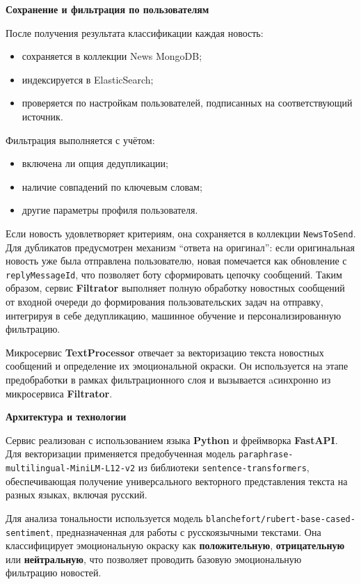 \textbf{Сохранение и фильтрация по пользователям}

После получения результата классификации каждая новость:
\begin{itemize}
    \item сохраняется в коллекции News MongoDB;
    \item индексируется в ElasticSearch;
    \item проверяется по настройкам пользователей, подписанных на соответствующий источник.
\end{itemize}
Фильтрация выполняется с учётом:
\begin{itemize}
    \item включена ли опция дедупликации;
    \item наличие совпадений по ключевым словам;
    \item другие параметры профиля пользователя.
\end{itemize}

Если новость удовлетворяет критериям, она сохраняется в коллекции \texttt{NewsToSend}.
Для дубликатов предусмотрен механизм ``ответа на оригинал'': если оригинальная новость уже была отправлена пользователю, новая помечается как обновление с \texttt{replyMessageId}, что позволяет боту сформировать цепочку сообщений.
Таким образом, сервис \textbf{Filtrator} выполняет полную обработку новостных сообщений от входной очереди до формирования пользовательских задач на отправку, интегрируя в себе дедупликацию, машинное обучение и персонализированную фильтрацию.

Микросервис \textbf{TextProcessor} отвечает за векторизацию текста новостных сообщений и определение их эмоциональной окраски.
Он используется на этапе предобработки в рамках фильтрационного слоя и вызывается aсинхронно из микросервиса \textbf{Filtrator}.

\textbf{Архитектура и технологии}

Сервис реализован с использованием языка \textbf{Python} и фреймворка \textbf{FastAPI}.
Для векторизации применяется предобученная модель \texttt{paraphrase-multilingual-MiniLM-L12-v2} из библиотеки \texttt{sentence-transformers}, обеспечивающая получение универсального векторного представления текста на разных языках, включая русский.

Для анализа тональности используется модель \texttt{blanchefort/rubert-base-cased-sentiment}, предназначенная для работы с русскоязычными текстами.
Она классифицирует эмоциональную окраску как \textbf{положительную}, \textbf{отрицательную} или \textbf{нейтральную}, что позволяет проводить базовую эмоциональную фильтрацию новостей.

